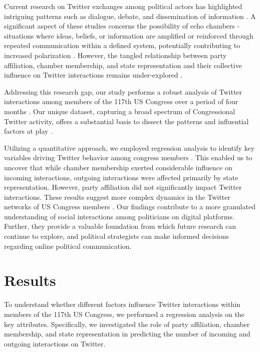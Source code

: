 \documentclass[11pt]{article}
\begin{document}
Current research on Twitter exchanges among political actors has highlighted intriguing patterns such as dialogue, debate, and dissemination of information \cite{Garimella2018PoliticalDO, Theocharis2020TheDO}. A significant aspect of these studies concerns the possibility of echo chambers - situations where ideas, beliefs, or information are amplified or reinforced through repeated communication within a defined system, potentially contributing to increased polarization \cite{Garimella2017ALA}. However, the tangled relationship between party affiliation, chamber membership, and state representation and their collective influence on Twitter interactions remains under-explored \cite{Chamberlain2021ANA, Valle2021PoliticalIB}.

Addressing this research gap, our study performs a robust analysis of Twitter interactions among members of the 117th US Congress over a period of four months \cite{Hua2020TowardsMA}. Our unique dataset, capturing a broad spectrum of Congressional Twitter activity, offers a substantial basis to dissect the patterns and influential factors at play \cite{Yoon2014StrategiesAT, Hua2020CharacterizingTU, Eady2023ExposureTT}.

Utilizing a quantitative approach, we employed regression analysis to identify key variables driving Twitter behavior among congress members \cite{Taddy2012MeasuringPS}. This enabled us to uncover that while chamber membership exerted considerable influence on incoming interactions, outgoing interactions were affected primarily by state representation. However, party affiliation did not significantly impact Twitter interactions. These results suggest more complex dynamics in the Twitter networks of US Congress members \cite{Chamberlain2021ANA}. Our findings contribute to a more granulated understanding of social interactions among politicians on digital platforms. Further, they provide a valuable foundation from which future research can continue to explore, and political strategists can make informed decisions regarding online political communication.

\section*{Results}

To understand whether different factors influence Twitter interactions within members of the 117th US Congress, we performed a regression analysis on the key attributes. Specifically, we investigated the role of party affiliation, chamber membership, and state representation in predicting the number of incoming and outgoing interactions on Twitter.
\end{document}

